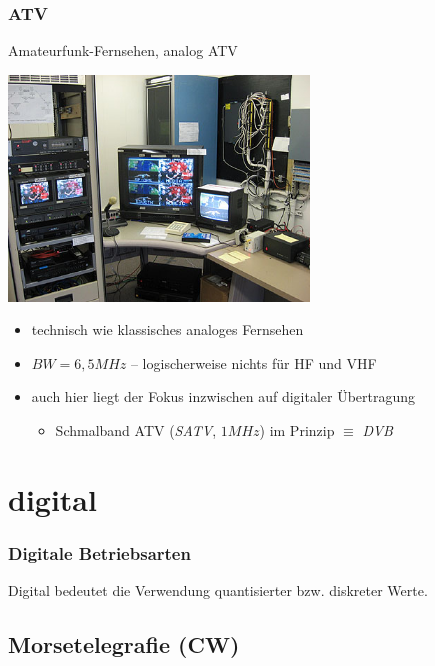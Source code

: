 \begin{frame}
    \frametitle{ATV}

    Amateurfunk-Fernsehen, analog ATV

    \begin{center}
        \includegraphics[width=0.6\textwidth,height=.45\textheight,keepaspectratio]{e16/SVECS-atv16.jpg}
        \tiny \hyperlink{refs}{\cite{atv}}
    \end{center}

    \begin{itemize}
        \item technisch wie klassisches analoges Fernsehen
        \item $BW = 6,5 MHz$ -- logischerweise nichts für HF und VHF
        \item auch hier liegt der Fokus inzwischen auf digitaler Übertragung
        \begin{itemize}
            \item Schmalband ATV (\emph{SATV}, $1 MHz$) im Prinzip $\equiv$ \emph{DVB}
        \end{itemize}
    \end{itemize}

\end{frame}

\section{digital}

\begin{frame}
    \frametitle{Digitale Betriebsarten}

    \centering Digital bedeutet die Verwendung quantisierter bzw. diskreter Werte.

\end{frame}

\subsection[CW]{Morsetelegrafie (CW)}

